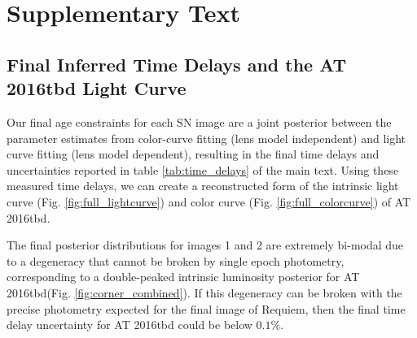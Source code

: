 \documentclass[12pt]{article}
\def\SNABC{AT 2016tbd\xspace}
\begin{document}
{\section*{Supplementary Text}

\subsection*{Final Inferred Time Delays and the \SNABC Light Curve}

Our final age constraints for each SN image are a joint posterior between the parameter estimates from color-curve fitting (lens model independent) and light curve fitting (lens model dependent), resulting in the final time delays and uncertainties reported in table \ref{tab:time_delays} of the main text. Using these measured time delays, we can create a reconstructed form of the intrinsic light curve (Fig. \ref{fig:full_lightcurve}) and color curve (Fig. \ref{fig:full_colorcurve}) of \SNABC.


The final posterior distributions for images 1 and 2 are extremely bi-modal due to a degeneracy that cannot be broken by single epoch photometry, corresponding to a double-peaked intrinsic luminosity posterior for \SNABC (Fig. \ref{fig:corner_combined}). If this degeneracy can be broken with the precise photometry expected for the final image of Requiem, then the final time delay uncertainty for \SNABC could be below $0.1\%$.


}
\end{document}
